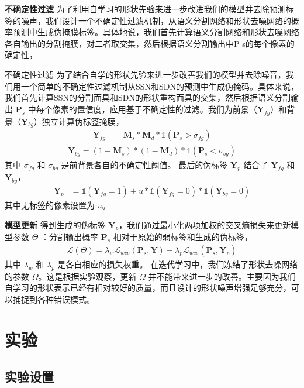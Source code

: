 \textbf{不确定性过滤} \quad 为了利用自学习的形状先验来进一步改进我们的模型并去除预测标签的噪声，我们设计一个不确定性过滤机制，从语义分割网络和形状去噪网络的概率预测中生成伪掩膜标签。具体地说，我们首先计算语义分割网络和形状去噪网络各自输出的分割掩膜，对二者取交集，然后根据语义分割输出中P s的每个像素的确定性，

不确定性过滤 为了结合自学的形状先验来进一步改善我们的模型并去除噪音，我们用一个简单的不确定性过滤机制从SSN和SDN的预测中生成伪掩码。具体来说，我们首先计算SSN的分割面具和SDN的形状重构面具的交集，然后根据语义分割输出 $\mathbf{P}_s$ 中每个像素的置信度，应用基于不确定性的过滤。我们为前景（$\mathbf{Y}_{fg}$）和背景（$\mathbf{Y}_{bg}$）独立计算伪标签掩膜，
\begin{align}
    \mathbf{Y}_{fg} &= \mathbf{M}_s * \mathbf{M}_d * \mathds{1} (\mathbf{P}_s > \sigma_{fg})
\end{align}
\begin{align}
    \mathbf{Y}_{bg} = (1-\mathbf{M}_s) * (1-\mathbf{M}_d) * \mathds{1} (\mathbf{P}_s < \sigma_{bg})
\end{align}
其中 $\sigma_{fg}$ 和 $\sigma_{bg}$ 是前背景各自的不确定性阈值。
最后的伪标签 $\mathbf{Y}_p$ 结合了 $\mathbf{Y}_{fg}$ 和 $\mathbf{Y}_{bg}$，
\begin{align}
    \mathbf{Y}_p &= \mathds{1}(\mathbf{Y}_{fg} = 1) + u * \mathds{1}(\mathbf{Y}_{fg} = 0) * \mathds{1}(\mathbf{Y}_{bg} = 0)
\end{align}
其中无标签的像素设置为 $u$。

\textbf{模型更新} \quad 得到生成的伪标签 $\mathbf{Y}_p$，我们通过最小化两项加权的交叉熵损失来更新模型参数 $\Theta$ ：分割输出概率 $\mathbf{P}_s$ 相对于原始的弱标签和生成的伪标签，
\begin{align}
    \mathcal{L} (\Theta) = \lambda_w \mathcal{L}_{wce} (\mathbf{P}_s, \mathbf{Y}) + \lambda_p \mathcal{L}_{wce} (\mathbf{P}_s, \mathbf{Y}_p)
\end{align}
其中 $\lambda_w$ 和 $\lambda_p$ 是各自相应的损失权重。
在迭代学习中，我们冻结了形状去噪网络的参数 $\Omega$。这是根据实验观察，更新 $\Omega$ 并不能带来进一步的改善。主要因为我们自学习的形状表示已经有相对较好的质量，而且设计的形状噪声增强足够充分，可以捕捉到各种错误模式。


\section{实验}


\subsection{实验设置}




